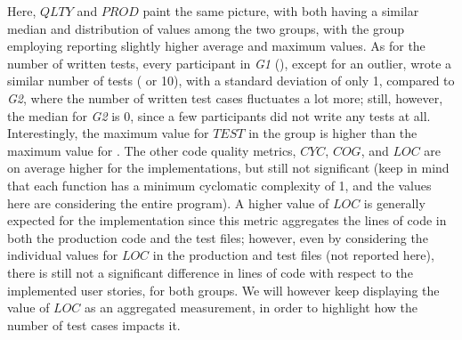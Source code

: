 Here, $QLTY$ and $PROD$ paint the same picture, with both having a similar median and distribution of values among the two groups, with the group employing \tdd reporting slightly higher average and maximum values.
As for the number of written tests, every participant in \textit{G1} (\tdd), except for an outlier, wrote a similar number of tests ( or 10), with a standard deviation of only 1, compared to \textit{G2}, where the number of written test cases fluctuates a lot more; still, however, the median for \textit{G2} is 0, since a few participants did not write any tests at all. Interestingly, the maximum value for $TEST$ in the \notdd group is higher than the maximum value for \tdd.
The other code quality metrics, $CYC$, $COG$, and $LOC$ are on average higher for the \tdd implementations, but still not significant (keep in mind that each function has a minimum cyclomatic complexity of 1, and the values here are considering the entire program).
A higher value of $LOC$ is generally expected for the \tdd implementation since this metric aggregates the lines of code in both the production code and the test files; however, even by considering the individual values for $LOC$ in the production and test files (not reported here), there is still not a significant difference in lines of code with respect to the implemented user stories, for both groups. We will however keep displaying the value of $LOC$ as an aggregated measurement, in order to highlight how the number of test cases impacts it.

